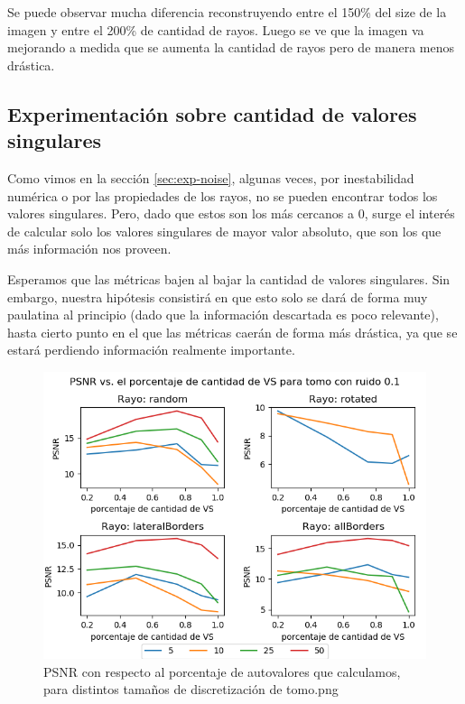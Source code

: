 Se puede observar mucha diferencia reconstruyendo entre el 150\% del size de la imagen y entre el 200\% de cantidad de rayos. Luego se ve que la imagen va mejorando a medida que se aumenta la cantidad de rayos pero de manera menos drástica.


\subsection{Experimentación sobre cantidad de valores singulares}
\label{sec:exp-eigenvalues}
Como vimos en la sección \ref{sec:exp-noise}, algunas veces, por inestabilidad numérica
o por las propiedades de los rayos, no se pueden encontrar todos los valores singulares.
Pero, dado que estos son los más cercanos a 0, surge el interés de calcular solo los
valores singulares de mayor valor absoluto, que son los que más información nos proveen.

Esperamos que las métricas bajen al bajar la cantidad de valores singulares.
Sin embargo, nuestra hipótesis consistirá en que esto solo se dará de forma
muy paulatina al principio (dado que la información descartada es poco relevante),
hasta cierto punto en el que las métricas caerán de forma más drástica,
ya que se estará perdiendo información realmente importante.

\begin{figure}[H]
    \centering
    \includegraphics[width=\textwidth]{../graficos/eigens/tomo/noise_graph_2.png}
    \caption{PSNR con respecto al porcentaje de autovalores que calculamos, para distintos tamaños de discretización de tomo.png}
    \label{fig:exp-eigen-tomo}
\end{figure}

